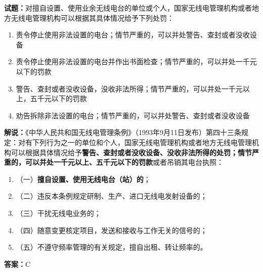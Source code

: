 \documentclass{ctexbook}
\begin{document}
\noindent\textbf{试题：}对擅自设置、使用业余无线电台的单位或个人，国家无线电管理机构或者地方无线电管理机构可以根据其具体情况给予下列处罚：
\begin{enumerate}[leftmargin=3em]
  \item  责令停止使用非法设置的电台；情节严重的，可以并处警告、查封或者没收设备
  \item  责令停止使用非法设置的电台并作出书面检查；情节严重的，可以并处一千元以下的罚款
  \item  警告、查封或者没收设备，没收非法所得；情节严重的，可以并处一千元以上，五千元以下的罚款
  \item  劝告拆除非法设置的电台；情节严重的，可以并处警告、查封或者没收设备
\end{enumerate}
\noindent\textbf{解说：}《中华人民共和国无线电管理条例》（1993年9月11日发布）第四十三条规定：对有下列行为之一的单位和个人，国家无线电管理机构或者地方无线电管理机构可以根据具体情况给予\textbf{警告、查封或者没收设备、没收非法所得的处罚；情节严重的，可以并处一千元以上、五千元以下的罚款}或者吊销其电台执照：
\begin{enumerate}[leftmargin=3em, label=]
  \item（一）\textbf{擅自设置、使用无线电台（站）的}；
  \item（二）违反本条例规定研制、生产、进口无线电发射设备的；
  \item（三）干扰无线电业务的；
  \item（四）随意变更核定项目，发送和接收与工作无关的信号的；
  \item（五）不遵守频率管理的有关规定，擅自出租、转让频率的。
\end{enumerate}
\textbf{答案：}C


\vspace{\baselineskip}
\end{document}
